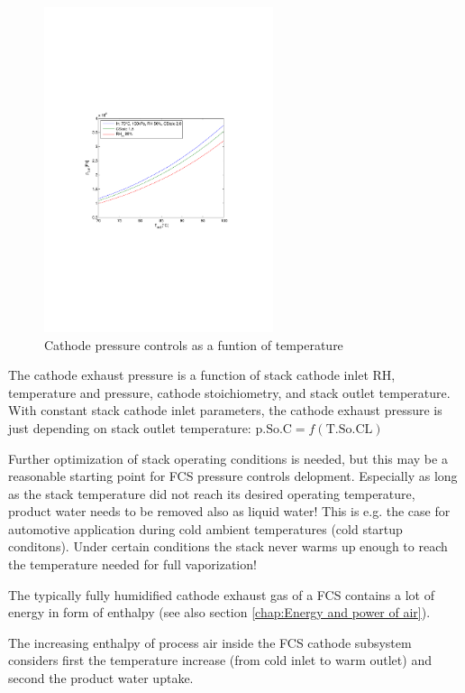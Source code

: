 \documentclass[11pt,a4paper,english,twoside]{scrreprt}
\begin{document}
\begin{figure}
  \centering
  \includegraphics*[width=0.6\textwidth,angle=0]{FCF_Chart_Y_So_C.pdf}
  \caption[Cathode pressure controls as a funtion of temperature]{Cathode pressure controls as a funtion of temperature}
  \label{fig:PressureControls}
\end{figure}

The cathode exhaust pressure is a function of stack cathode inlet RH, temperature and pressure, cathode stoichiometry, and stack outlet temperature. With constant stack cathode inlet parameters, the cathode exhaust pressure is just depending on stack outlet temperature: $\mathrm{p.So.C} = f(\mathrm{T.So.CL})$

Further optimization of stack operating conditions is needed, but this may be a reasonable starting point for FCS pressure controls delopment. Especially as long as the stack temperature did not reach its desired operating temperature, product water needs to be removed also as liquid water! This is e.g. the case for automotive application during cold ambient temperatures (cold startup conditons). Under certain conditions the stack never warms up enough to reach the temperature needed for full vaporization!

The typically fully humidified cathode exhaust gas of a FCS contains a lot of energy in form of enthalpy (see also section \ref{chap:Energy and power of air}).

The increasing enthalpy of process air inside the FCS cathode subsystem considers first the temperature increase (from cold inlet to warm outlet) and second the product water uptake.
\end{document}
